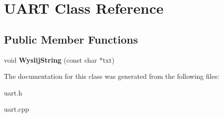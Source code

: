 \hypertarget{classUART}{\section{U\+A\+R\+T Class Reference}
\label{classUART}
}
\subsection*{Public Member Functions}
\begin{DoxyCompactItemize}
\item 
\hypertarget{classUART_a826fef81cfaa0f6fddb1b90e84cdddb4}{void {\bfseries Wyslij\+String} (const char $\ast$txt)}\label{classUART_a826fef81cfaa0f6fddb1b90e84cdddb4}

\end{DoxyCompactItemize}


The documentation for this class was generated from the following files\+:\begin{DoxyCompactItemize}
\item 
uart.\+h\item 
uart.\+cpp\end{DoxyCompactItemize}
